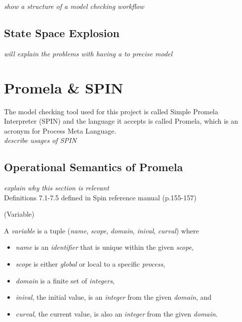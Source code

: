 \textit{show a structure of a model checking workflow}

\subsection{State Space Explosion}

\textit{will explain the problems with having a to precise model}

\section{Promela \& SPIN}

The model checking tool used for this project is called Simple Promela Interpreter (SPIN) and the language it accepts is called Promela, which is an acronym for Process Meta Language. \\

\textit{describe usages of SPIN}

\subsection{Operational Semantics of Promela}

\textit{explain why this section is relevant} \\

Definitions 7.1-7.5 defined in Spin reference manual (p.155-157) \cite{spinreferencemanualbook}

\begin{definition}{}{}
\label{def:Variable}
(Variable) 

A \textit{variable} is a tuple (\textit{name}, \textit{scope}, \textit{domain}, \textit{inival}, \textit{curval}) where

\begin{itemize}
\item[] \textit{name} is an \textit{identifier} that is unique within the given \textit{scope},
\item[] \textit{scope} is either \textit{global} or local to a specific \textit{process},
\item[] \textit{domain} is a finite set of \textit{integers},
\item[] \textit{inival}, the initial value, is an \textit{integer} from the given \textit{domain}, and
\item[] \textit{curval}, the current value, is also an \textit{integer} from the given \textit{domain}.
\end{itemize}
\end{definition}

